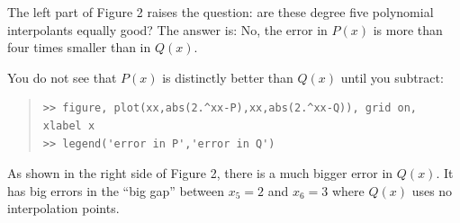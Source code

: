 \documentclass[11pt]{amsart}
\begin{document}
The left part of Figure 2 raises the question: are these degree five polynomial interpolants equally good?  The answer is:  No, the error in $P(x)$ is more than four times smaller than in $Q(x)$.

You do not see that $P(x)$ is distinctly better than $Q(x)$ until you subtract:
\small\begin{quote}\begin{Verbatim}
>> figure, plot(xx,abs(2.^xx-P),xx,abs(2.^xx-Q)), grid on, xlabel x
>> legend('error in P','error in Q')
\end{Verbatim}
\end{quote}\normalsize
As shown in the right side of Figure 2, there is a much bigger error in $Q(x)$.  It has big errors in the ``big gap'' between $x_5=2$ and $x_6=3$ where $Q(x)$ uses no interpolation points.
\end{document}
